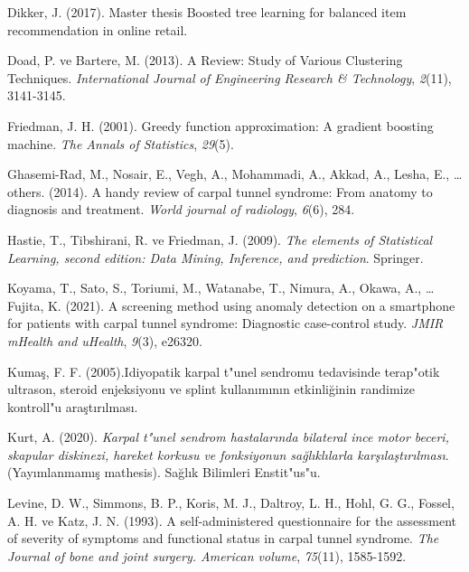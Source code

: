 \documentclass[12pt,twoside]{deuthesis}
\begin{document}
\begin{CSLReferences}{1}{0}
\leavevmode{}%
Dikker, J. (2017). Master thesis Boosted tree learning for balanced item recommendation in online retail.

\leavevmode{}%
Doad, P. ve Bartere, M. (2013). A Review: Study of Various Clustering Techniques. \emph{International Journal of Engineering Research \& Technology}, \emph{2}(11), 3141-3145.

\leavevmode{}%
Friedman, J. H. (2001). Greedy function approximation: A gradient boosting machine. \emph{The Annals of Statistics}, \emph{29}(5).

\leavevmode{}%
Ghasemi-Rad, M., Nosair, E., Vegh, A., Mohammadi, A., Akkad, A., Lesha, E., \ldots{} others. (2014). A handy review of carpal tunnel syndrome: From anatomy to diagnosis and treatment. \emph{World journal of radiology}, \emph{6}(6), 284.

\leavevmode{}%
Hastie, T., Tibshirani, R. ve Friedman, J. (2009). \emph{The elements of Statistical Learning, second edition: Data Mining, Inference, and prediction}. Springer.

\leavevmode{}%
Koyama, T., Sato, S., Toriumi, M., Watanabe, T., Nimura, A., Okawa, A., \ldots{} Fujita, K. (2021). A screening method using anomaly detection on a smartphone for patients with carpal tunnel syndrome: Diagnostic case-control study. \emph{JMIR mHealth and uHealth}, \emph{9}(3), e26320.

\leavevmode{}%
Kumaş, F. F. (2005).{I}diyopatik karpal t{"u}nel sendromu tedavisinde terap{"o}tik ultrason, steroid enjeksiyonu ve splint kullan{ı}m{ı}n{ı}n etkinli{ğ}inin randimize kontroll{"u} ara{ş}t{ı}r{ı}lmas{ı}.

\leavevmode{}%
Kurt, A. (2020). \emph{Karpal t{"u}nel sendrom hastalar{ı}nda bilateral ince motor beceri, skapular diskinezi, hareket korkusu ve fonksiyonun sa{ğ}l{ı}kl{ı}larla kar{ş}{ı}la{ş}t{ı}r{ı}lmas{ı}}. (Yayımlanmamış mathesis). Sa{ğ}l{ı}k Bilimleri Enstit{"u}s{"u}.

\leavevmode{}%
Levine, D. W., Simmons, B. P., Koris, M. J., Daltroy, L. H., Hohl, G. G., Fossel, A. H. ve Katz, J. N. (1993). A self-administered questionnaire for the assessment of severity of symptoms and functional status in carpal tunnel syndrome. \emph{The Journal of bone and joint surgery. American volume}, \emph{75}(11), 1585-1592.


\end{CSLReferences}
\end{document}
